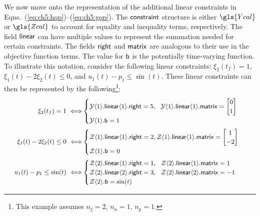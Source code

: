 We now move onto the representation of the additional linear constraints in Eqns.~(\ref{eq:ch5:hqp})--(\ref{eq:ch5:gqp}).
The $\textup{\textsf{constraint}}$ structure is either $\gls{Ycal}$ or $\gls{Zcal}$ to account for equality and inequality terms, respectively.
The field $\textup{\textsf{linear}}$ can have multiple values to represent the summation needed for certain constraints.
The fields $\textup{\textsf{right}}$ and $\textup{\textsf{matrix}}$ are analogous to their use in the objective function terms.
The value for $\textup{\textsf{b}}$ is the potentially time-varying function.
To illustrate this notation, consider the following linear constraints: $\xi_2(t_f) = 1$, $\xi_1(t) - 2 \xi_2(t) \leq 0$, and $u_1(t) - p_1 \leq \sin(t)$.
These linear constraints can then be represented by the following\footnote{This example assumes $n_{\xi}=2$, $n_u=1$, $n_p=1$.}:%
\allowdisplaybreaks[1]%
\begin{subequations}%
\small
\begin{align}
\xi_2(t_f) = 1 \ \Longleftrightarrow 
&\begin{cases}
\mathcal{Y}\xind{1}.\xvar{linear}\xind{1}.\xvar{right} = 5, \ \ \mathcal{Y}\xind{1}.\xvar{linear}\xind{1}.\xvar{matrix} = \begin{bmatrix} 0 \\ 1 \end{bmatrix}  \\
 \mathcal{Y}\xind{1}.\xvar{b} = 1 
\end{cases} \\
%
%
\xi_1(t) - 2 \xi_2(t) \leq 0 \ \Longleftrightarrow 
&\begin{cases}
\mathcal{Z}\xind{1}.\xvar{linear}\xind{1}.\xvar{right} = 2, \mathcal{Z}\xind{1}.\xvar{linear}\xind{1}.\xvar{matrix} = \begin{bmatrix} 1 \\ -2 \end{bmatrix} \\
\mathcal{Z}\xind{1}.\xvar{b} = 0 
\end{cases} \\
%
%
u_1(t) - p_1 \leq \sin(t) \ \Longleftrightarrow 
&\begin{cases}
\mathcal{Z}\xind{2}.\xvar{linear}\xind{1}.\xvar{right} = 1, \ \ \mathcal{Z}\xind{2}.\xvar{linear}\xind{1}.\xvar{matrix} = 1 \\
\mathcal{Z}\xind{2}.\xvar{linear}\xind{2}.\xvar{right} = 3, \ \ \mathcal{Z}\xind{2}.\xvar{linear}\xind{2}.\xvar{matrix} = -1 \\
\mathcal{Z}\xind{2}.\xvar{b} = \sin(t)
\end{cases}
\end{align}
\end{subequations}%
\allowdisplaybreaks[0]%


